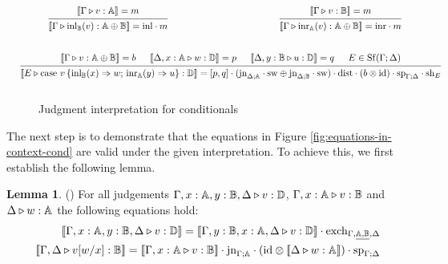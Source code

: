 \documentclass[10pt,a4paper]{amsart}
\theoremstyle{definition}
\theoremstyle{definition}
\theoremstyle{definition}
\newtheorem{lemma}[definition]{Lemma}
\theoremstyle{definition}
\theoremstyle{definition}
\theoremstyle{definition}
\begin{document}
\begin{figure}[H]
  \begin{equation*}
  \begin{aligned}
  &\hspace{10pt}
  \begin{prooftree}
      \hypo{ [\![\Gamma \vljud v: \typeA]\!] = m }
      \infer1[]{ [\![ \Gamma \vljud \text{inl}_{\typeB} (v):  \typeA \oplus \typeB  ]\!] = \inl  \comp m}
  \end{prooftree}
  \hspace{120pt}
  \begin{prooftree}
    \hypo{ [\![\Gamma \vljud v: \typeB]\!] = m }
    \infer1[]{ [\![ \Gamma \vljud \text{inr}_{\typeA} (v):  \typeA \oplus \typeB  ]\!] = \inr  \comp m}
\end{prooftree}
  \\[20pt]
  &\hspace{-20pt}
  \begin{prooftree}
      \hypo{[\![\Gamma\vljud v: \typeA \oplus \typeB ]\!] = b}
      \hypo{[\![\Delta, x:\typeA \vljud w: \typeD ]\!] = p}
      \hypo{ [\![\Delta,y:\typeB \vljud u: \typeD ]\!] = q }
      \hypo{E \in \Shuff(\Gamma; \Delta)}
      \infer4[]{ [\![E \vljud \text{case } v\,  \{\text{inl}_{\typeB} (x) \Rightarrow w ;\, \text{inr}_{\typeA} (y) \Rightarrow u\}: \typeD ]\!] =   [p,q] \comp (\text{jn}_{\Delta;\typeA}\comp \sw \oplus \text{jn}_{\Delta;\typeB}\comp \sw) \comp \dist \comp (b \otimes \text{id}) \comp \text{sp}_{\Gamma;\Delta} \comp \text{sh}_{E}}
  \end{prooftree}
  \\[10pt]
  \end{aligned}
  \end{equation*}
  \caption{Judgment interpretation for conditionals}
\label{fig:denotational_sem cond}
\end{figure}


The next step is to demonstrate that the equations in Figure \ref{fig:equations-in-context-cond} are valid under the given interpretation. To achieve this, we first establish the following lemma.

\begin{lemma} \label{lem_interpret_exch:sub} () For all judgements $\Gamma,x:\mathbb{A}, y:\mathbb{B}, \Delta \triangleright v: \mathbb{D}$, $\Gamma,x:\mathbb{A} \triangleright v: \mathbb{B}$ and $\Delta \triangleright w: \mathbb{A}$  the following equations hold: 
  \begin{equation*}
\begin{split}
  [\![\Gamma,x:\typeA, y:\typeB, \Delta \vljud v: \typeD]\!] = [\![\Gamma,y:\typeB,x:\typeA,  \Delta \vljud v: \typeD]\! ] \comp \text{exch}_{\Gamma, \underline{ \typeA, \typeB} ,\Delta} \\
  [\![\Gamma, \Delta \vljud v[w/x]: \typeB]\!] = [\![\Gamma, x:\typeA \vljud v: \typeB]\!]\comp \text{jn}_{\Gamma;\typeA} \comp (\text{id} \otimes [\![ \Delta  \vljud w: \typeA]\!] ) \comp \text{sp}_{\Gamma;\Delta} 
\end{split}
  \end{equation*}
\end{lemma}
\end{document}
